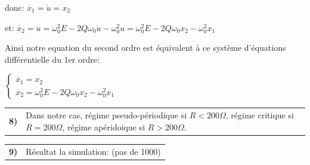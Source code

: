 \documentclass{article}
\newcommand{\question}[2]
{
    \begin{tabularx}{\linewidth}{lX}
        \textbf{#1)} & {#2}
    \end{tabularx} 
}
\begin{document}
{{      donc: $\dot{x_1}=\dot{u}=x_2$

      et: $\dot{x_2}=\ddot{u}=\omega_0^2E-2Q\omega_0\dot{u}-\omega_0^2u=\omega_0^2E-2Q\omega_0x_2-\omega_0^2x_1$

      Ainsi notre equation du second ordre est équivalent à ce système d'équations différentielle du 1er ordre:
      
      $\boxed{\begin{cases}
        \dot{x_1}=x_2 \\
        \dot{x_2}=\omega_0^2E-2Q\omega_0x_2-\omega_0^2x_1
      \end{cases}}$
    }

    \question{8}{
      Dans notre cas, régime pseudo-périodique si $R<200\Omega$, régime critique si $R=200\Omega$, régime apéridoique si $R>200\Omega$.
    }

    \question{9}{Résultat la simulation: (pas de 1000)}

}
\end{document}
